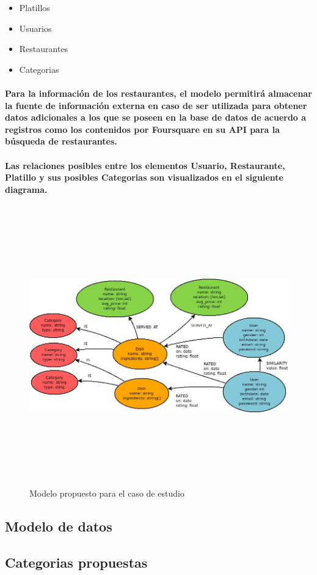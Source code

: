 \begin{itemize}
  \item Platillos
  \item Usuarios
  \item Restaurantes
  \item Categorias 
\end{itemize}

\paragraph{Para la información de los restaurantes, el modelo  permitirá almacenar la fuente de información externa en caso de ser utilizada para obtener datos adicionales a los que se poseen en la base de datos de acuerdo a registros como los contenidos por Foursquare en su API para la búsqueda de restaurantes.}

\paragraph{Las relaciones posibles entre los elementos Usuario, Restaurante, Platillo y sus posibles Categorias son visualizados en el siguiente diagrama.}

\newpage
    \begin{landscape}
      \begin{figure}[h!]
      \centering
      \includegraphics[width=22.5cm,height=12cm]{./images/Modelo_datos.jpg}
      \caption{Modelo propuesto para el caso de estudio}
    \end{figure}
    \end{landscape}
  \newpage

\newpage
\subsection{Modelo de datos}
   

\subsection{Categorias propuestas}
   

